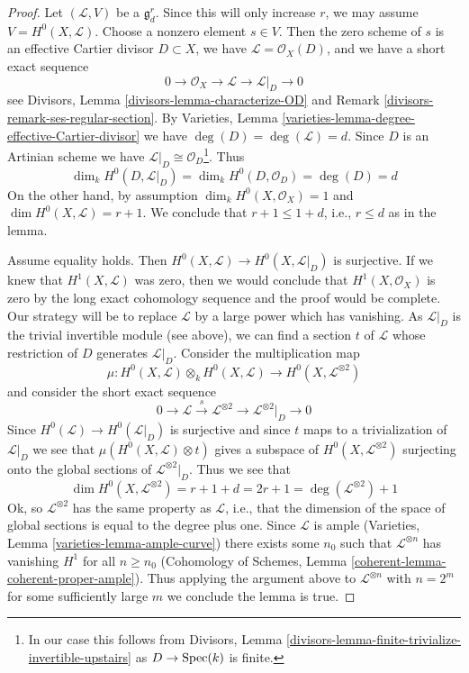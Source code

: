 \begin{proof}
Let $(\mathcal{L}, V)$ be a $\mathfrak g^r_d$. Since this will only
increase $r$, we may assume $V = H^0(X, \mathcal{L})$. Choose a
nonzero element $s \in V$.  Then the zero scheme of $s$ is an effective Cartier
divisor $D \subset X$, we have $\mathcal{L} = \mathcal{O}_X(D)$, and
we have a short exact sequence
$$
0 \to \mathcal{O}_X \to \mathcal{L} \to \mathcal{L}|_D \to 0
$$
see Divisors, Lemma \ref{divisors-lemma-characterize-OD} and
Remark \ref{divisors-remark-ses-regular-section}.
By Varieties, Lemma \ref{varieties-lemma-degree-effective-Cartier-divisor}
we have $\deg(D) = \deg(\mathcal{L}) = d$.
Since $D$ is an Artinian scheme we have
$\mathcal{L}|_D \cong \mathcal{O}_D$\footnote{In our case this
follows from Divisors, Lemma
\ref{divisors-lemma-finite-trivialize-invertible-upstairs}
as $D \to \mathop{\mathrm{Spec}}(k)$ is finite.}.
Thus
$$
\dim_k H^0(D, \mathcal{L}|_D) = \dim_k H^0(D, \mathcal{O}_D) = \deg(D) = d
$$
On the other hand, by assumption
$\dim_k H^0(X, \mathcal{O}_X) = 1$ and $\dim H^0(X, \mathcal{L}) = r + 1$.
We conclude that $r + 1 \leq 1 + d$, i.e., $r \leq d$ as in the lemma.

\medskip\noindent
Assume equality holds. Then
$H^0(X, \mathcal{L}) \to H^0(X, \mathcal{L}|_D)$ is surjective.
If we knew that $H^1(X, \mathcal{L})$ was zero, then we would
conclude that $H^1(X, \mathcal{O}_X)$ is zero by the long exact
cohomology sequence and the proof would
be complete. Our strategy will be to replace $\mathcal{L}$ by a
large power which has vanishing. As $\mathcal{L}|_D$ is the
trivial invertible module (see above), we can
find a section $t$ of $\mathcal{L}$ whose restriction
of $D$ generates $\mathcal{L}|_D$.
Consider the multiplication map
$$
\mu :
H^0(X, \mathcal{L}) \otimes_k H^0(X, \mathcal{L})
\longrightarrow
H^0(X, \mathcal{L}^{\otimes 2})
$$
and consider the short exact sequence
$$
0 \to \mathcal{L} \xrightarrow{s}
\mathcal{L}^{\otimes 2} \to \mathcal{L}^{\otimes 2}|_D \to 0
$$
Since $H^0(\mathcal{L}) \to H^0(\mathcal{L}|_D)$ is surjective and since
$t$ maps to a trivialization of $\mathcal{L}|_D$ we see that
$\mu(H^0(X, \mathcal{L}) \otimes t)$ gives a subspace of
$H^0(X, \mathcal{L}^{\otimes 2})$ surjecting onto the global sections of
$\mathcal{L}^{\otimes 2}|_D$. Thus we see that
$$
\dim H^0(X, \mathcal{L}^{\otimes 2}) = r + 1 + d = 2r + 1 =
\deg(\mathcal{L}^{\otimes 2}) + 1
$$
Ok, so $\mathcal{L}^{\otimes 2}$ has the same property as $\mathcal{L}$, i.e.,
that the dimension of the space of global sections is equal to the
degree plus one. Since $\mathcal{L}$ is ample
(Varieties, Lemma \ref{varieties-lemma-ample-curve})
there exists some $n_0$ such that $\mathcal{L}^{\otimes n}$
has vanishing $H^1$ for all $n \geq n_0$
(Cohomology of Schemes, Lemma \ref{coherent-lemma-coherent-proper-ample}).
Thus applying the argument above to $\mathcal{L}^{\otimes n}$
with $n = 2^m$ for some sufficiently large $m$ we conclude the
lemma is true.
\end{proof}

